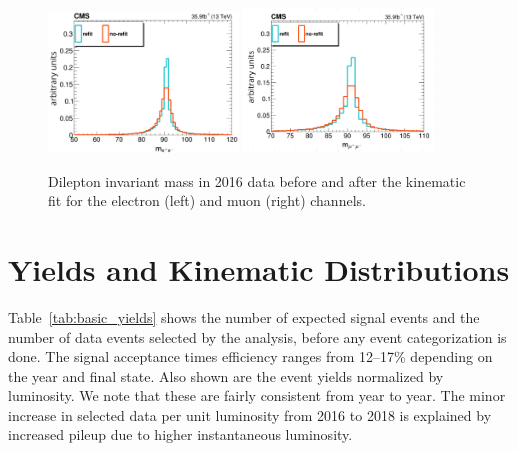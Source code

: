 \begin{figure}[tb]
	\begin{center}
		\includegraphics[width=0.45\textwidth]{fig/selection/kinfit_data_el.png}
		\includegraphics[width=0.45\textwidth]{fig/selection/kinfit_data_mu.png}
	\end{center}
	\caption{Dilepton invariant mass in 2016 data before and after the kinematic fit for the electron (left) and muon (right) channels.}
	\label{fig:kinfit}
\end{figure}

\section{Yields and Kinematic Distributions}
Table~\ref{tab:basic_yields} shows the number of expected \hzg{} signal events and the number of data events selected by the analysis, before any event categorization is done. The signal acceptance times efficiency ranges from 12--17\% depending on the year and final state. Also shown are the event yields normalized by luminosity. We note that these are fairly consistent from year to year. The minor increase in selected data per unit luminosity from 2016 to 2018 is explained by increased pileup due to higher instantaneous luminosity.

